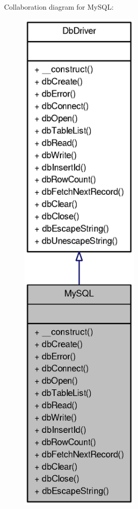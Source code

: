 Collaboration diagram for MySQL:\nopagebreak
\begin{figure}[H]
\begin{center}
\leavevmode
\includegraphics[width=162pt]{classMySQL__coll__graph}
\end{center}
\end{figure}
